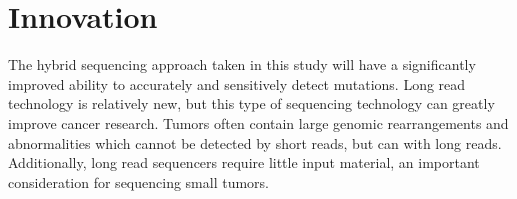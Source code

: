 
% 






\section{Innovation}

The hybrid sequencing approach taken in this study will have a significantly improved ability to accurately and sensitively detect mutations. Long read technology is relatively new, but this type of sequencing technology can greatly improve cancer research. Tumors often contain large genomic rearrangements and abnormalities which cannot be detected by short reads, but can with long reads. Additionally, long read sequencers require little input material, an important consideration for sequencing small tumors.

